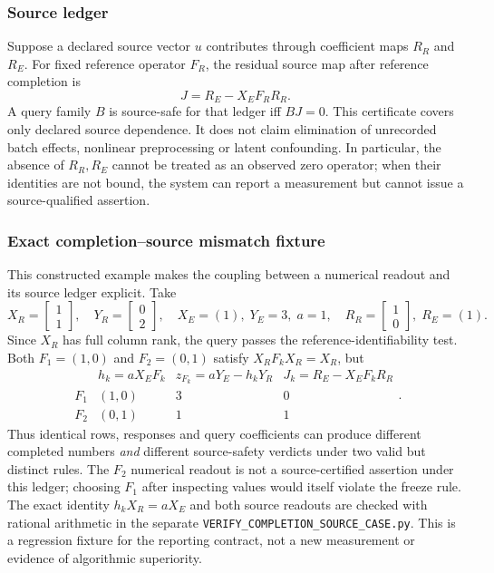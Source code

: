 \documentclass[11pt]{article}
\begin{document}
\subsubsection{Source ledger}
Suppose a declared source vector $u$ contributes through coefficient maps $R_R$ and $R_E$. For fixed reference operator $F_R$, the residual source map after reference completion is
\[
J=R_E-X_EF_RR_R.
\]
A query family $B$ is source-safe for that ledger iff $BJ=0$. This certificate covers only declared source dependence. It does not claim elimination of unrecorded batch effects, nonlinear preprocessing or latent confounding. In particular, the absence of $R_R,R_E$ cannot be treated as an observed zero operator; when their identities are not bound, the system can report a measurement but cannot issue a source-qualified assertion.

\subsubsection{Exact completion--source mismatch fixture}
\label{supp:completion-source-fixture}
This constructed example makes the coupling between a numerical readout and its source ledger explicit. Take
\[
X_R=\begin{bmatrix}1\\1\end{bmatrix},\quad
Y_R=\begin{bmatrix}0\\2\end{bmatrix},\quad
X_E=(1),\;Y_E=3,\;a=1,\quad
R_R=\begin{bmatrix}1\\0\end{bmatrix},\;R_E=(1).
\]
Since $X_R$ has full column rank, the query passes the reference-identifiability test. Both $F_1=(1,0)$ and $F_2=(0,1)$ satisfy $X_RF_kX_R=X_R$, but
\[
\begin{array}{c|ccc}
 & h_k=aX_EF_k & z_{F_k}=aY_E-h_kY_R & J_k=R_E-X_EF_kR_R\\\hline
F_1&(1,0)&3&0\\
F_2&(0,1)&1&1
\end{array}.
\]
Thus identical rows, responses and query coefficients can produce different completed numbers \emph{and} different source-safety verdicts under two valid but distinct rules. The $F_2$ numerical readout is not a source-certified assertion under this ledger; choosing $F_1$ after inspecting values would itself violate the freeze rule. The exact identity $h_kX_R=aX_E$ and both source readouts are checked with rational arithmetic in the separate \texttt{VERIFY\_COMPLETION\_SOURCE\_CASE.py}. This is a regression fixture for the reporting contract, not a new measurement or evidence of algorithmic superiority.
\end{document}
